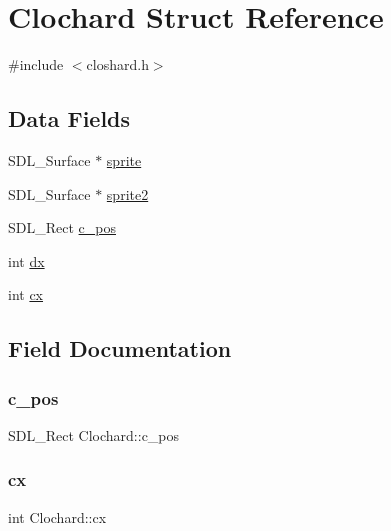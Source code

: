 \hypertarget{structClochard}{}\section{Clochard Struct Reference}
\label{structClochard}


{\ttfamily \#include $<$closhard.\+h$>$}

\subsection*{Data Fields}
\begin{DoxyCompactItemize}
\item 
S\+D\+L\+\_\+\+Surface $\ast$ \hyperlink{structClochard_a34522552cf1d2a44598bac76517e25ca}{sprite}
\item 
S\+D\+L\+\_\+\+Surface $\ast$ \hyperlink{structClochard_a1db48fc1cb139bdb2ccc18b675b59c60}{sprite2}
\item 
S\+D\+L\+\_\+\+Rect \hyperlink{structClochard_ac4bcafee4207a9233a3009916799d10c}{c\+\_\+pos}
\item 
int \hyperlink{structClochard_a1d43a4487cdf784496d9255a15f1c64e}{dx}
\item 
int \hyperlink{structClochard_a85da10470ca6863f61ca2e5734a2420f}{cx}
\end{DoxyCompactItemize}


\subsection{Field Documentation}
\mbox{\label{structClochard_ac4bcafee4207a9233a3009916799d10c}} 
\subsubsection{\texorpdfstring{c\+\_\+pos}{c\_pos}}
{\footnotesize\ttfamily S\+D\+L\+\_\+\+Rect Clochard\+::c\+\_\+pos}

\mbox{\label{structClochard_a85da10470ca6863f61ca2e5734a2420f}} 
\subsubsection{\texorpdfstring{cx}{cx}}
{\footnotesize\ttfamily int Clochard\+::cx}

